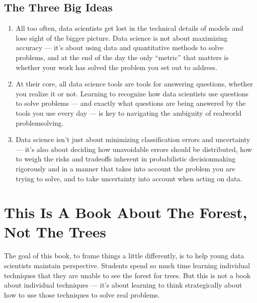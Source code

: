 \documentclass[letterpaper,10pt,english]{jupyterBook}
\begin{document}
\subsection{The Three Big Ideas}
\label{\detokenize{10_introduction/10_solving_problems_with_data:the-three-big-ideas}}\begin{enumerate}
%
\item {} 
\sphinxAtStartPar
{} All too often, data scientists get lost in the technical details of models and lose sight of the bigger picture. Data science is not about maximizing accuracy — it’s about using data and quantitative methods to solve problems, and at the end of the day the only “metric” that matters is whether your work has solved the problem you set out to address.

\item {} 
\sphinxAtStartPar
{} At their core, all data science tools are tools for answering questions, whether you realize it or not. Learning to recognize how data scientists use questions to solve problems — and exactly what questions are being answered by the tools you use every day — is key to navigating the ambiguity of real\sphinxhyphen{}world problem\sphinxhyphen{}solving.

\item {} 
\sphinxAtStartPar
{} Data science isn’t just about minimizing classification errors and uncertainty — it’s also about deciding how unavoidable errors should be distributed, how to weigh the risks and trade\sphinxhyphen{}offs inherent in probabilistic decision\sphinxhyphen{}making rigorously and in a manner that takes into account the problem you are trying to solve, and to take uncertainty into account when acting on data.

\end{enumerate}


\section{This Is A Book About The Forest, Not The Trees}
\label{\detokenize{10_introduction/10_solving_problems_with_data:this-is-a-book-about-the-forest-not-the-trees}}
\sphinxAtStartPar
The goal of this book, to frame things a little differently, is to help young data scientists maintain perspective. Students spend so much time learning individual techniques that they are unable to see the forest for trees. But this is not a book about individual techniques — it’s about learning to think strategically about how to use those techniques to solve real problems.
\end{document}
